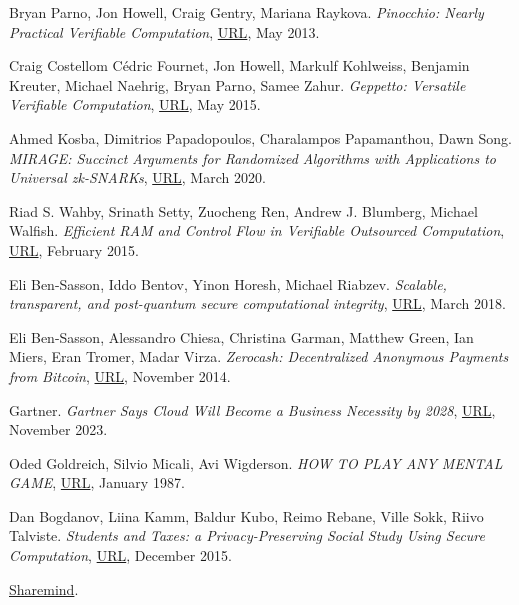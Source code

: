 \documentclass{Resources/UoBLab1}
\theoremstyle{definition}
\begin{document}
\begin{thebibliography}{10}
 Bryan Parno, Jon Howell, Craig Gentry, Mariana Raykova. \textit{Pinocchio: Nearly Practical Verifiable Computation}, \href{https://eprint.iacr.org/2013/279.pdf}{URL}, May 2013.

 Craig Costellom Cédric Fournet, Jon Howell, Markulf Kohlweiss, Benjamin Kreuter, Michael Naehrig, Bryan Parno, Samee Zahur. \textit{Geppetto: Versatile Verifiable Computation}, \href{https://ieeexplore.ieee.org/stamp/stamp.jsp?tp=&arnumber=7163030}{URL}, May 2015.

 Ahmed Kosba, Dimitrios Papadopoulos, Charalampos Papamanthou, Dawn Song. \textit{MIRAGE: Succinct Arguments for Randomized Algorithms with Applications to Universal zk-SNARKs}, \href{https://eprint.iacr.org/2020/278.pdf}{URL}, March 2020.

 Riad S. Wahby, Srinath Setty, Zuocheng Ren, Andrew J. Blumberg, Michael Walfish. \textit{Efficient RAM and Control Flow in Verifiable Outsourced Computation}, \href{https://www.ndss-symposium.org/wp-content/uploads/2017/09/07_3_2.pdf}{URL}, February 2015.

 Eli Ben-Sasson, Iddo Bentov, Yinon Horesh, Michael Riabzev. \textit{Scalable, transparent, and post-quantum secure computational integrity}, \href{https://eprint.iacr.org/2018/046.pdf}{URL}, March 2018.

 Eli Ben-Sasson, Alessandro Chiesa, Christina Garman, Matthew Green, Ian Miers, Eran Tromer, Madar Virza. \textit{Zerocash: Decentralized Anonymous Payments from Bitcoin}, \href{https://ieeexplore.ieee.org/stamp/stamp.jsp?tp=&arnumber=6956581}{URL}, November 2014.

 Gartner. \textit{Gartner Says Cloud Will Become a Business Necessity by 2028}, \href{https://www.gartner.com/en/newsroom/press-releases/2023-11-29-gartner-says-cloud-will-become-a-business-necessity-by-2028}{URL}, November 2023.

 Oded Goldreich, Silvio Micali, Avi Wigderson. \textit{HOW TO PLAY ANY MENTAL GAME}, \href{https://dl.acm.org/doi/pdf/10.1145/28395.28420}{URL}, January 1987.

 Dan Bogdanov, Liina Kamm, Baldur Kubo, Reimo Rebane, Ville Sokk, Riivo Talviste. \textit{Students and Taxes: a Privacy-Preserving Social Study Using Secure Computation}, \href{https://eprint.iacr.org/2015/1159.pdf}{URL}, December 2015.

 \href{https://sharemind.cyber.ee}{Sharemind}.


\end{thebibliography}
\end{document}
